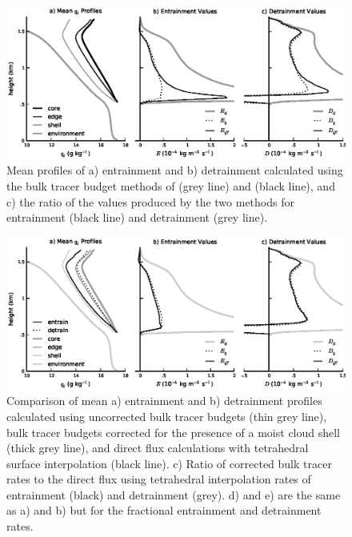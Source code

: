 \documentclass[draft,grl]{agutex}
\begin{document}



\begin{figure}
  \label{fig:shell_correction}
  \noindent\includegraphics[width=39pc]{./figures/shell_correction}
  \caption{Mean profiles of a) entrainment and b) detrainment calculated 
  using the bulk tracer budget methods of \cite{Siebesma1995} (grey line) 
  and \cite{Romps2010} (black line), and c) the ratio of the values produced 
  by the two methods for entrainment (black line) and detrainment (grey line).
  }
\end{figure}

\begin{figure}
  \label{fig:reynolds_correction}
  \noindent\includegraphics[width=39pc]{./figures/reynolds_correction}
  \caption{Comparison of mean a) entrainment and b) detrainment profiles 
  calculated using uncorrected bulk tracer budgets (thin grey line), bulk
  tracer budgets corrected for the presence of a moist cloud shell (thick grey
  line), and direct flux calculations with tetrahedral surface interpolation 
  (black line).  c) Ratio of corrected bulk tracer rates to the direct flux 
  using tetrahedral interpolation rates of entrainment (black) and detrainment 
  (grey).  d) and e) are the same as a) and b) but for the fractional 
  entrainment and detrainment rates.}
\end{figure}
\end{document}

